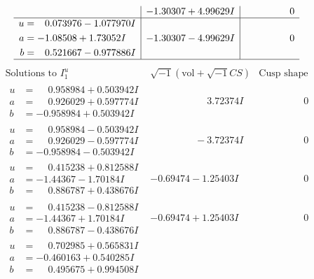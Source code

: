 \documentclass[1p]{elsarticle_modified}
\theoremstyle{definition}
\newcommand{\I}{\sqrt{-1}}
\begin{document}
$$\begin{array}{c|c|c}
 & -1.30307 + 4.99629 I & \phantom{-0.000000 } 0 \\ \hline\begin{aligned}
u &= \phantom{-}0.073976 - 1.077970 I \\
a &= -1.08508 + 1.73052 I \\
b &= \phantom{-}0.521667 - 0.977886 I\end{aligned}
 & -1.30307 - 4.99629 I & \phantom{-0.000000 } 0\\
 \hline 
 \end{array}$$\newpage$$\begin{array}{c|c|c}  
\text{Solutions to }I^u_{1}& \I (\text{vol} + \sqrt{-1}CS) & \text{Cusp shape}\\
 \hline 
\begin{aligned}
u &= \phantom{-}0.958984 + 0.503942 I \\
a &= \phantom{-}0.926029 + 0.597774 I \\
b &= -0.958984 + 0.503942 I\end{aligned}
 & \phantom{-0.000000 -}3.72374 I & \phantom{-0.000000 } 0 \\ \hline\begin{aligned}
u &= \phantom{-}0.958984 - 0.503942 I \\
a &= \phantom{-}0.926029 - 0.597774 I \\
b &= -0.958984 - 0.503942 I\end{aligned}
 & \phantom{-0.000000 } -3.72374 I & \phantom{-0.000000 } 0 \\ \hline\begin{aligned}
u &= \phantom{-}0.415238 + 0.812588 I \\
a &= -1.44367 - 1.70184 I \\
b &= \phantom{-}0.886787 + 0.438676 I\end{aligned}
 & -0.69474 - 1.25403 I & \phantom{-0.000000 } 0 \\ \hline\begin{aligned}
u &= \phantom{-}0.415238 - 0.812588 I \\
a &= -1.44367 + 1.70184 I \\
b &= \phantom{-}0.886787 - 0.438676 I\end{aligned}
 & -0.69474 + 1.25403 I & \phantom{-0.000000 } 0 \\ \hline\begin{aligned}
u &= \phantom{-}0.702985 + 0.565831 I \\
a &= -0.460163 + 0.540285 I \\
b &= \phantom{-}0.495675 + 0.994508 I\end{aligned}

\end{array}$$
\end{document}
